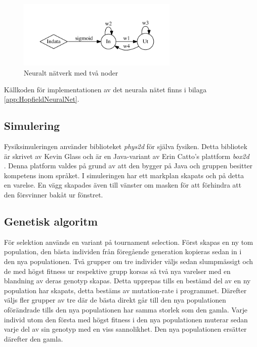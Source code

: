 \documentclass[titlepage, twocolumn, a4paper, 12pt, swedish]{article}
\begin{document}
\begin{figure}[H]
  \begin{center}
    \includegraphics[width=78mm]{images/neuralnet.pdf}
    \caption{Neuralt nätverk med två noder}
    \label{fig:neuralnet.pdf}
  \end{center}
\end{figure}


Källkoden för implementationen av det neurala nätet finns i bilaga \ref{app:HopfieldNeuralNet}.

\subsection{Simulering}
Fysiksimuleringen använder biblioteket \textit{phys2d} \cite{phys2d} för själva fysiken. Detta bibliotek är skrivet av Kevin Glass och är en Java-variant av Erin Catto's plattform \textit{box2d} \cite{box2d}. Denna platform valdes på grund av att den bygger på Java och gruppen besitter kompetens inom språket. I simuleringen har ett markplan skapats och på detta en varelse. En vägg skapades även till vänster om masken för att förhindra att den försvinner bakåt ur fönstret.

\subsection{Genetisk algoritm}
För selektion används en variant på tournament selection. Först skapas en ny tom population, den bästa individen från föregående generation kopieras sedan in i den nya populationen. Två grupper om tre individer väljs sedan slumpmässigt och de med högst fitness ur respektive grupp korsas så två nya varelser med en blandning av deras genotyp skapas. Detta upprepas tills en bestämd del av en ny population har skapats, detta bestäms av mutation-rate i programmet. Därefter väljs fler grupper av tre där de bästa direkt går till den nya populationen oförändrade tills den nya populationen har samma storlek som den gamla. Varje individ utom den första med högst fitness i den nya populationen muterar sedan varje del av sin genotyp med en viss sannolikhet. Den nya populationen ersätter därefter den gamla. 
\end{document}
